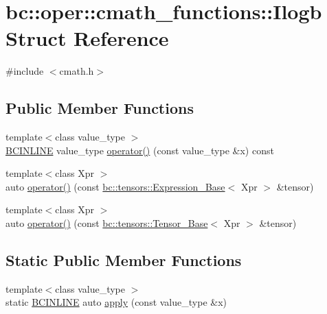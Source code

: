 \hypertarget{structbc_1_1oper_1_1cmath__functions_1_1Ilogb}{}\section{bc\+:\+:oper\+:\+:cmath\+\_\+functions\+:\+:Ilogb Struct Reference}
\label{structbc_1_1oper_1_1cmath__functions_1_1Ilogb}


{\ttfamily \#include $<$cmath.\+h$>$}

\subsection*{Public Member Functions}
\begin{DoxyCompactItemize}
\item 
{\footnotesize template$<$class value\+\_\+type $>$ }\\\hyperlink{common_8h_a6699e8b0449da5c0fafb878e59c1d4b1}{B\+C\+I\+N\+L\+I\+NE} value\+\_\+type \hyperlink{structbc_1_1oper_1_1cmath__functions_1_1Ilogb_a30fcdda2aa70dddb9f5e6e1eac57c571}{operator()} (const value\+\_\+type \&x) const
\item 
{\footnotesize template$<$class Xpr $>$ }\\auto \hyperlink{structbc_1_1oper_1_1cmath__functions_1_1Ilogb_a3c8c4f715782e316ad71f9c15ca02758}{operator()} (const \hyperlink{classbc_1_1tensors_1_1Expression__Base}{bc\+::tensors\+::\+Expression\+\_\+\+Base}$<$ Xpr $>$ \&tensor)
\item 
{\footnotesize template$<$class Xpr $>$ }\\auto \hyperlink{structbc_1_1oper_1_1cmath__functions_1_1Ilogb_a0623495e2121f786fc57146e03fc034b}{operator()} (const \hyperlink{classbc_1_1tensors_1_1Tensor__Base}{bc\+::tensors\+::\+Tensor\+\_\+\+Base}$<$ Xpr $>$ \&tensor)
\end{DoxyCompactItemize}
\subsection*{Static Public Member Functions}
\begin{DoxyCompactItemize}
\item 
{\footnotesize template$<$class value\+\_\+type $>$ }\\static \hyperlink{common_8h_a6699e8b0449da5c0fafb878e59c1d4b1}{B\+C\+I\+N\+L\+I\+NE} auto \hyperlink{structbc_1_1oper_1_1cmath__functions_1_1Ilogb_a16529d8d6cba575c1d87d1f3f3ffec40}{apply} (const value\+\_\+type \&x)
\end{DoxyCompactItemize}


